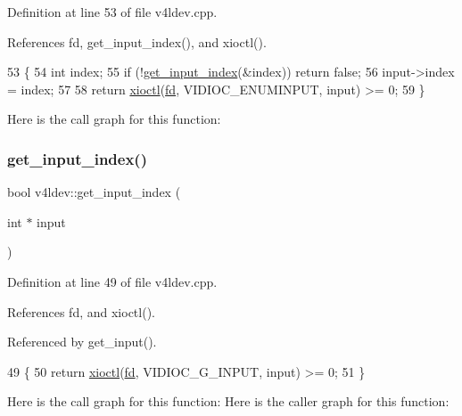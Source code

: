 Definition at line 53 of file v4ldev.\+cpp.



References fd, get\+\_\+input\+\_\+index(), and xioctl().


\begin{DoxyCode}
53                                                 \{
54     \textcolor{keywordtype}{int} index;
55     \textcolor{keywordflow}{if} (!\hyperlink{classv4ldev_adb85ceff191f9d0ebc65239c6c8d5e42}{get\_input\_index}(&index)) \textcolor{keywordflow}{return} \textcolor{keyword}{false};
56     input->index = index;
57 
58     \textcolor{keywordflow}{return} \hyperlink{classv4ldev_ab93cb1ab18254ca362310b006bd2552d}{xioctl}(\hyperlink{classv4ldev_a2cd44be3be75a19ab8bec12b28e29142}{fd}, VIDIOC\_ENUMINPUT, input) >= 0;
59 \}
\end{DoxyCode}
Here is the call graph for this function\+:
\mbox{\label{classv4ldev_adb85ceff191f9d0ebc65239c6c8d5e42}} 
\subsubsection{\texorpdfstring{get\+\_\+input\+\_\+index()}{get\_input\_index()}}
{\footnotesize\ttfamily bool v4ldev\+::get\+\_\+input\+\_\+index (\begin{DoxyParamCaption}\item[{int $\ast$}]{input }\end{DoxyParamCaption})}



Definition at line 49 of file v4ldev.\+cpp.



References fd, and xioctl().



Referenced by get\+\_\+input().


\begin{DoxyCode}
49                                         \{
50     \textcolor{keywordflow}{return} \hyperlink{classv4ldev_ab93cb1ab18254ca362310b006bd2552d}{xioctl}(\hyperlink{classv4ldev_a2cd44be3be75a19ab8bec12b28e29142}{fd}, VIDIOC\_G\_INPUT, input) >= 0;
51 \}
\end{DoxyCode}
Here is the call graph for this function\+:
Here is the caller graph for this function\+:
\mbox{\label{classv4ldev_a76f01fd5ac53c94bca14cfbb13c57f71}} 

